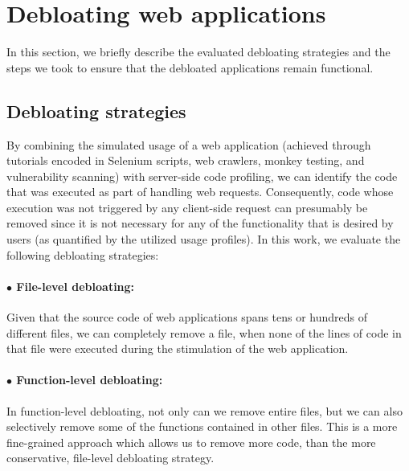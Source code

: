 \section{Debloating web applications}
\label{sec:debloating}

In this section, we briefly describe the evaluated debloating strategies and
the steps we took to ensure that the debloated applications remain functional.


\subsection{Debloating strategies}

By combining the simulated usage of a web application (achieved through
tutorials encoded in Selenium scripts, web crawlers, monkey testing, and
vulnerability scanning) with
server-side code profiling, we can identify the code that was executed
as part of handling web requests. Consequently, code whose execution was
not triggered by any client-side request can presumably be removed since
it is not necessary for any of the functionality that is desired by users
(as quantified by the utilized usage profiles).
In this work, we evaluate the following debloating strategies:
\vspace{-2ex}
\paragraph{$\bullet$ File-level debloating:} Given that the source code of web
applications spans tens or hundreds of different files, we can completely
remove a file, when none of the lines of code in that file were executed
during the stimulation of the web application.
\vspace{-2ex}
\paragraph{$\bullet$ Function-level debloating:} In function-level debloating, not
only can we remove entire files, but we can also selectively remove some of
the functions contained in other files. This is a more fine-grained approach
which allows us to remove more code, than the more conservative, file-level
debloating strategy.

%


